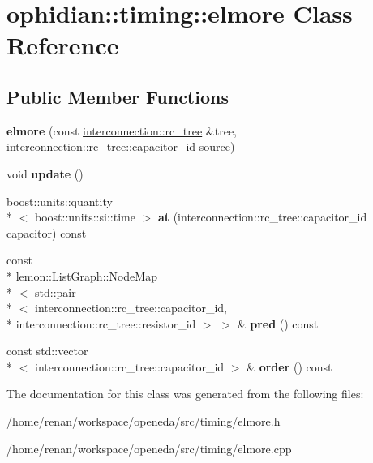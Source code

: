 \hypertarget{classophidian_1_1timing_1_1elmore}{\section{ophidian\-:\-:timing\-:\-:elmore Class Reference}
\label{classophidian_1_1timing_1_1elmore}
}
\subsection*{Public Member Functions}
\begin{DoxyCompactItemize}
\item 
\hypertarget{classophidian_1_1timing_1_1elmore_ad8309fff264fbfc5f82310fe669605a4}{{\bfseries elmore} (const \hyperlink{classophidian_1_1interconnection_1_1rc__tree}{interconnection\-::rc\-\_\-tree} \&tree, interconnection\-::rc\-\_\-tree\-::capacitor\-\_\-id source)}\label{classophidian_1_1timing_1_1elmore_ad8309fff264fbfc5f82310fe669605a4}

\item 
\hypertarget{classophidian_1_1timing_1_1elmore_a1da1fad65ca359baa0fe890a88c06125}{void {\bfseries update} ()}\label{classophidian_1_1timing_1_1elmore_a1da1fad65ca359baa0fe890a88c06125}

\item 
\hypertarget{classophidian_1_1timing_1_1elmore_ae0a847f6d99e8e388c78a3f452060618}{boost\-::units\-::quantity\\*
$<$ boost\-::units\-::si\-::time $>$ {\bfseries at} (interconnection\-::rc\-\_\-tree\-::capacitor\-\_\-id capacitor) const }\label{classophidian_1_1timing_1_1elmore_ae0a847f6d99e8e388c78a3f452060618}

\item 
\hypertarget{classophidian_1_1timing_1_1elmore_a696582c33ed7028fae6e2504c7dd534f}{const \\*
lemon\-::\-List\-Graph\-::\-Node\-Map\\*
$<$ std\-::pair\\*
$<$ interconnection\-::rc\-\_\-tree\-::capacitor\-\_\-id, \\*
interconnection\-::rc\-\_\-tree\-::resistor\-\_\-id $>$ $>$ \& {\bfseries pred} () const }\label{classophidian_1_1timing_1_1elmore_a696582c33ed7028fae6e2504c7dd534f}

\item 
\hypertarget{classophidian_1_1timing_1_1elmore_a623be5b85590424ebed37d5da77bf9da}{const std\-::vector\\*
$<$ interconnection\-::rc\-\_\-tree\-::capacitor\-\_\-id $>$ \& {\bfseries order} () const }\label{classophidian_1_1timing_1_1elmore_a623be5b85590424ebed37d5da77bf9da}

\end{DoxyCompactItemize}


The documentation for this class was generated from the following files\-:\begin{DoxyCompactItemize}
\item 
/home/renan/workspace/openeda/src/timing/elmore.\-h\item 
/home/renan/workspace/openeda/src/timing/elmore.\-cpp\end{DoxyCompactItemize}
